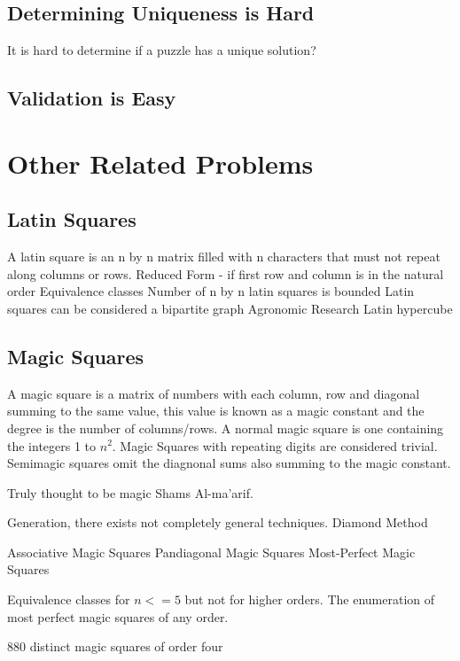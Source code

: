\documentclass[a4paper,12pt]{article}
\begin{document}
	\subsection{Determining Uniqueness is Hard}

		It is hard to determine if a puzzle has a unique solution?
		
	\subsection{Validation is Easy}
\section{Other Related Problems}
	\subsection{Latin Squares}

		A latin square is an n by n matrix filled with n characters that must not repeat along columns or rows.
		Reduced Form -  if first row and column is in the natural order
		Equivalence classes
		Number of n by n latin squares is bounded
		Latin squares can be considered a bipartite graph
		Agronomic Research
		Latin hypercube

	\subsection{Magic Squares}

		A magic square is a matrix of numbers with each column, row and diagonal summing to the same value, 
		this value is known as a magic constant and the degree is the number of columns/rows.
		A normal magic square is one containing the integers 1 to $n^2$.
		Magic Squares with repeating digits are considered trivial.
		Semimagic squares omit the diagnonal sums also summing to the magic constant.

		Truly thought to be magic Shams Al-ma'arif.

		Generation, there exists not completely general techniques. Diamond Method

		Associative Magic Squares
		Pandiagonal Magic Squares
		Most-Perfect Magic Squares
		
		Equivalence classes for $n<=5$ but not for higher orders.
		The enumeration of most perfect magic squares of any order.

		880 distinct magic squares of order four
\end{document}
